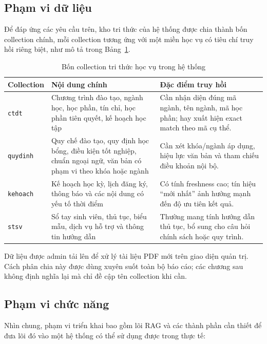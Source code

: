 \documentclass[../DoAn.tex]{subfiles}
\begin{document}
\subsection{Phạm vi dữ liệu}
\label{subsec:collections}

Để đáp ứng các yêu cầu trên, kho tri thức của hệ thống được chia thành bốn
collection chính, mỗi collection tương ứng với một miền học vụ có tiêu chí truy
hồi riêng biệt, như mô tả trong Bảng~\ref{tab:ch1-collections}.

\begin{table}[H]
\centering
\small
\begin{tabular}{|p{2.2cm}|p{5.4cm}|p{5.4cm}|}
\hline
\textbf{Collection} & \textbf{Nội dung chính} & \textbf{Đặc điểm truy hồi} \\
\hline
\texttt{ctdt} & Chương trình đào tạo, ngành học, học phần, tín chỉ, học phần
tiên quyết, kế hoạch học tập & Cần nhận diện đúng mã ngành, tên ngành, mã học
phần; hay xuất hiện exact match theo mã cụ thể. \\
\hline
\texttt{quydinh} & Quy chế đào tạo, quy định học bổng, điều kiện tốt nghiệp,
chuẩn ngoại ngữ, văn bản có phạm vi theo khóa hoặc ngành & Cần xét khóa/ngành
áp dụng, hiệu lực văn bản và tham chiếu điều khoản nội bộ. \\
\hline
\texttt{kehoach} & Kế hoạch học kỳ, lịch đăng ký, thông báo và các nội dung
có yếu tố thời điểm & Có tính freshness cao; tín hiệu ``mới nhất'' ảnh hưởng
mạnh đến độ ưu tiên kết quả. \\
\hline
\texttt{stsv} & Sổ tay sinh viên, thủ tục, biểu mẫu, dịch vụ hỗ trợ và thông
tin hướng dẫn & Thường mang tính hướng dẫn thủ tục, bổ sung cho câu hỏi chính
sách hoặc quy trình. \\
\hline
\end{tabular}
\caption{Bốn collection tri thức học vụ trong hệ thống}
\label{tab:ch1-collections}
\end{table}

Dữ liệu được admin tải lên để xử lý tài liệu PDF mới trên giao diện
quản trị. Cách phân chia này được dùng xuyên suốt toàn bộ báo cáo; các chương
sau không định nghĩa lại mà chỉ đề cập tên collection khi cần.

\subsection{Phạm vi chức năng}

Nhìn chung, phạm vi triển khai bao gồm lõi RAG và các thành phần cần thiết để
đưa lõi đó vào một hệ thống có thể sử dụng được trong thực tế:
\end{document}
